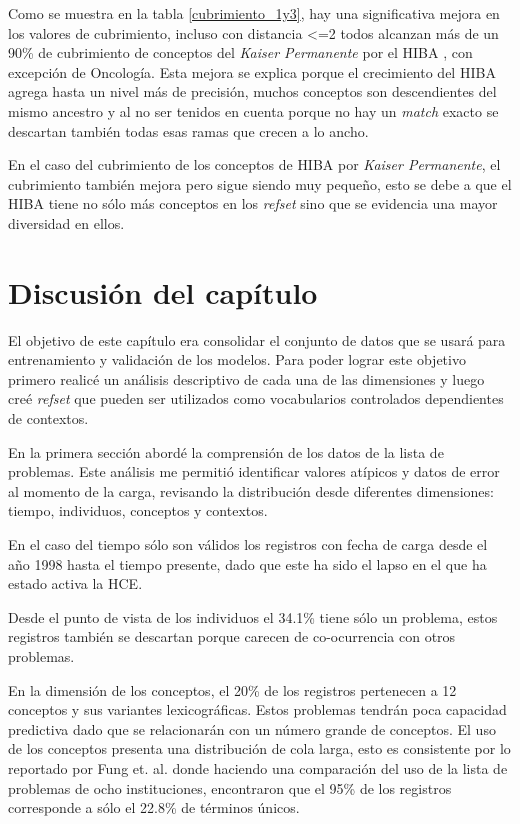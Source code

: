 Como se muestra en la tabla \ref{cubrimiento_1y3}, hay una significativa mejora en los valores de cubrimiento, incluso con distancia \textless=2 todos alcanzan más de un 90\% de cubrimiento de conceptos del \textit{Kaiser Permanente} por el \acrshort{HIBA} , con excepción de Oncología. Esta mejora se explica porque el crecimiento del \acrshort{HIBA} agrega hasta un nivel más de precisión, muchos conceptos son descendientes del mismo ancestro y al no ser tenidos en cuenta porque no hay un \textit{match} exacto se descartan también todas esas ramas que crecen a lo ancho.

En el caso del cubrimiento de los conceptos de \acrshort{HIBA} por \textit{Kaiser Permanente}, el cubrimiento también mejora pero sigue siendo muy pequeño, esto se debe a que el  \acrshort{HIBA} tiene no sólo más conceptos en los \textit{\acrshort{refset}}  sino que se evidencia una mayor diversidad en ellos.
 
\section{Discusión del capítulo}
El objetivo de este capítulo era consolidar el conjunto de datos que se usará para entrenamiento y validación de los modelos. Para poder lograr este objetivo primero realicé un análisis descriptivo de cada una de las dimensiones y luego creé \textit{\acrshort{refset}} que pueden ser utilizados como vocabularios controlados dependientes de contextos.

En la primera sección abordé la comprensión de los datos de la lista de problemas. Este análisis me permitió identificar valores atípicos y datos de error al momento de la carga, revisando la distribución desde diferentes dimensiones: tiempo, individuos, conceptos y contextos. 

En el caso del tiempo sólo son válidos los registros con fecha de carga desde el año 1998 hasta el tiempo presente, dado que este ha sido el lapso en el que ha estado activa la \acrshort{HCE}.

Desde el punto de vista de los individuos  el 34.1\% tiene sólo un problema, estos registros también se descartan porque carecen de co-ocurrencia con otros problemas.

En la dimensión de los conceptos, el 20\% de los registros pertenecen a 12 conceptos y sus variantes lexicográficas. Estos problemas tendrán poca capacidad predictiva dado que se relacionarán con un número grande de conceptos. El uso de los conceptos presenta una distribución de cola larga, esto es consistente por lo reportado por Fung et. al.\cite{Fung2015AnCT} donde haciendo una comparación del uso de la lista de problemas de ocho instituciones, encontraron que el 95\% de los registros corresponde a sólo el 22.8\% de términos únicos.

